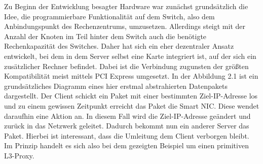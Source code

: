Zu Beginn der Entwicklung besagter Hardware war zunächst grundsätzlich die Idee, die programmierbare Funktionalität auf dem Switch, also dem Anbindungspunkt des Rechenzentrums, umzusetzen. Allerdings steigt mit der Anzahl der Knoten im Teil hinter dem Switch auch die benötigte Rechenkapazität des Switches. \cite{smartswitches} Daher hat sich ein eher dezentraler Ansatz entwickelt, bei dem in dem Server selbst eine Karte integriert ist, auf der sich ein zusätzlicher Rechner befindet. Dabei ist die Verbindung zugunsten der größten Kompatibilität meist mittels PCI Express umgesetzt. In der Abbildung 2.1 ist ein grundsätzliches Diagramm eines hier erstmal abstrahierten Datenpakets dargestellt. Der Client schickt ein Paket mit einer bestimmten Ziel-IP-Adresse los und zu einem gewissen Zeitpunkt erreicht das Paket die Smart NIC. Diese wendet daraufhin eine Aktion an. In diesem Fall wird die Ziel-IP-Adresse geändert und zurück in das Netzwerk geleitet. Dadurch bekommt nun ein anderer Server das Paket. Hierbei ist interessant, dass die Umleitung dem Client verborgen bleibt. Im Prinzip handelt es sich also bei dem gezeigten Beispiel um einen primitiven L3-Proxy.
